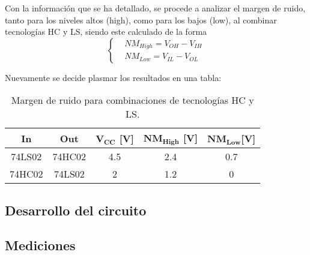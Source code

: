 Con la información que se ha detallado, se procede a analizar el margen de ruido, tanto para los niveles altos (high), como para los bajos (low), al combinar tecnologías HC y LS, siendo este calculado de la forma
\begin{equation*}
\left\{
\begin{aligned}
		& NM_{High}= V_{OH} - V_{IH} \\
		& NM_{Low}= V_{IL} - V_{OL} 
\end{aligned}
\right.
\end{equation*}

Nuevamente se decide plasmar los resultados en una tabla:
\begin{table}[H]
\centering
\begin{tabular}{|c|c|c|c|c|}
\hline
\textbf{In} & \textbf{Out} & $\mathbf{V_{CC}}$ \textbf{[V]} & $\mathbf{NM_{High}}$ \textbf{[V]} & $\mathbf{NM_{Low}} $\textbf{[V]} \\ \hline
74LS02      & 74HC02       & 4.5                            & 2.4                               & 0.7                              \\ 
74HC02      & 74LS02       & 2                              & 1.2                               & 0                                \\ \hline
\end{tabular}
\caption{Margen de ruido para combinaciones de tecnologías HC y LS.}
\label{tabla:nm}
\end{table}




\subsection{Desarrollo del circuito}

\subsection{Mediciones}

